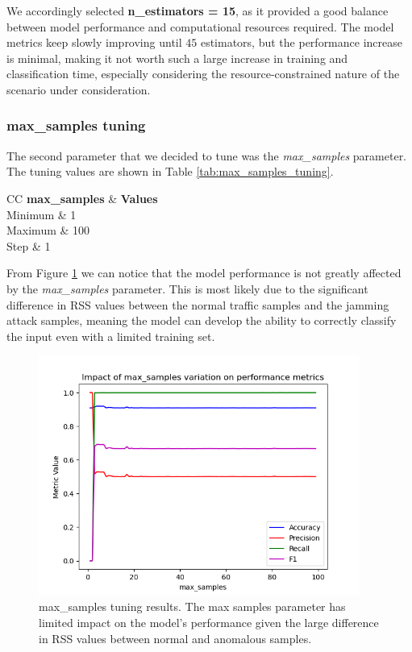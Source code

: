 \documentclass[futureinternet,article,submit,pdftex,moreauthors]{Definitions/mdpi}
\begin{document}
We accordingly selected \textbf{n\_estimators = 15}, as it provided a good balance between model performance and computational resources required.
The model metrics keep slowly improving until $45$ estimators, but the performance increase is minimal, making it not worth such a large increase in training and classification time, especially considering the resource-constrained nature of the scenario under consideration. 

\subsubsection{max\_samples tuning}

The second parameter that we decided to tune was the \textit{max\_samples} parameter. The tuning values are shown in Table \ref{tab:max_samples_tuning}.

\begin{table}[H]
	\caption{max\_samples tuning values.}\label{tab:max_samples_tuning}
	\begin{tabularx}{\textwidth}{CC}
	\toprule
	\textbf{max\_samples} & \textbf{Values} \\
	\midrule
	Minimum & 1 \\
	Maximum & 100 \\
	Step & 1 \\
	\bottomrule
\end{tabularx}
\end{table}

From Figure \ref{fig:max_samples_tuning} we can notice that the model performance is not greatly affected by the \textit{max\_samples} parameter. This is most likely due to the significant difference in RSS values between the normal traffic samples and the jamming attack samples, meaning the model can develop the ability to correctly classify the input even with a limited training set.

\begin{figure}[H]
	\centering
	\includegraphics[width=10.5cm]{img/maxSamplesTuning.png}
	\caption{max\_samples tuning results. The max samples parameter has limited impact on the model's performance given the large difference in RSS values between normal and anomalous samples.}\label{fig:max_samples_tuning}
\end{figure}
\unskip
\end{document}
